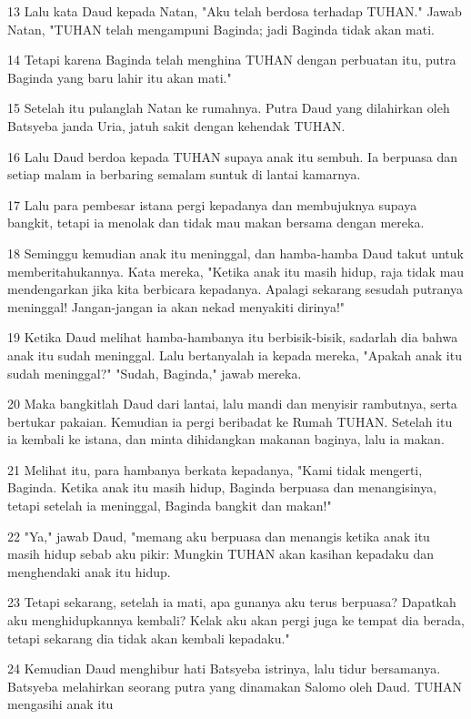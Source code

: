 \par 13 Lalu kata Daud kepada Natan, "Aku telah berdosa terhadap TUHAN." Jawab Natan, "TUHAN telah mengampuni Baginda; jadi Baginda tidak akan mati.
\par 14 Tetapi karena Baginda telah menghina TUHAN dengan perbuatan itu, putra Baginda yang baru lahir itu akan mati."
\par 15 Setelah itu pulanglah Natan ke rumahnya. Putra Daud yang dilahirkan oleh Batsyeba janda Uria, jatuh sakit dengan kehendak TUHAN.
\par 16 Lalu Daud berdoa kepada TUHAN supaya anak itu sembuh. Ia berpuasa dan setiap malam ia berbaring semalam suntuk di lantai kamarnya.
\par 17 Lalu para pembesar istana pergi kepadanya dan membujuknya supaya bangkit, tetapi ia menolak dan tidak mau makan bersama dengan mereka.
\par 18 Seminggu kemudian anak itu meninggal, dan hamba-hamba Daud takut untuk memberitahukannya. Kata mereka, "Ketika anak itu masih hidup, raja tidak mau mendengarkan jika kita berbicara kepadanya. Apalagi sekarang sesudah putranya meninggal! Jangan-jangan ia akan nekad menyakiti dirinya!"
\par 19 Ketika Daud melihat hamba-hambanya itu berbisik-bisik, sadarlah dia bahwa anak itu sudah meninggal. Lalu bertanyalah ia kepada mereka, "Apakah anak itu sudah meninggal?" "Sudah, Baginda," jawab mereka.
\par 20 Maka bangkitlah Daud dari lantai, lalu mandi dan menyisir rambutnya, serta bertukar pakaian. Kemudian ia pergi beribadat ke Rumah TUHAN. Setelah itu ia kembali ke istana, dan minta dihidangkan makanan baginya, lalu ia makan.
\par 21 Melihat itu, para hambanya berkata kepadanya, "Kami tidak mengerti, Baginda. Ketika anak itu masih hidup, Baginda berpuasa dan menangisinya, tetapi setelah ia meninggal, Baginda bangkit dan makan!"
\par 22 "Ya," jawab Daud, "memang aku berpuasa dan menangis ketika anak itu masih hidup sebab aku pikir: Mungkin TUHAN akan kasihan kepadaku dan menghendaki anak itu hidup.
\par 23 Tetapi sekarang, setelah ia mati, apa gunanya aku terus berpuasa? Dapatkah aku menghidupkannya kembali? Kelak aku akan pergi juga ke tempat dia berada, tetapi sekarang dia tidak akan kembali kepadaku."
\par 24 Kemudian Daud menghibur hati Batsyeba istrinya, lalu tidur bersamanya. Batsyeba melahirkan seorang putra yang dinamakan Salomo oleh Daud. TUHAN mengasihi anak itu
